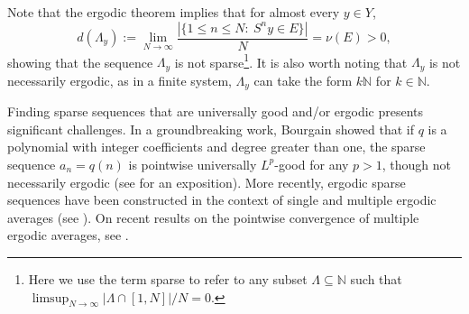 \documentclass[11pt]{amsart}
\numberwithin{equation}{section}
\theoremstyle{definition}
\theoremstyle{plain}
\newcommand{\N}{{\mathbb N}}
\begin{document}
Note that the ergodic theorem implies that for almost every $y\in Y$,
\[d(\Lambda_y):=\lim_{N\to \infty}\dfrac{|\{1\leq n\leq N:\ S^ny\in E\}|}{N}=\nu(E)>0,\]
showing that the sequence $\Lambda_y$ is not sparse\footnote{Here we use the term sparse to refer to any subset $\Lambda\subseteq \N$ such that $\limsup_{N\to \infty} |\Lambda \cap [1,N]|/N =0$.}. It is also worth noting that $\Lambda_y$ is not necessarily ergodic, as in a finite system, $\Lambda_y$ can take the form $k\N$ for $k\in \N$. 

Finding sparse sequences that are universally good and/or ergodic presents significant challenges. In a groundbreaking work, Bourgain \cite{Bourgain_Pointwise_89} showed that if $q$ is a polynomial with integer coefficients and degree greater than one, the sparse sequence $a_n=q(n)$ is pointwise universally $L^p$-good for any $p>1$, though not necessarily ergodic (see \cite{krause2023pointwiseergodictheoryexamples} for an exposition). More recently,  ergodic sparse sequences have been constructed in the context of single and multiple ergodic averages (see \cite{Boshernitzan_Kolesnik_Quas_Wierdl_erg_sequences:2005, Donoso_Ferre_Koutsogiannis_Sun_multicorr_joint_erg:2024,Donoso_Koutsogiannis_Kuca_Tsinas_Sun_multiple_Hardy,Donoso_Koutsogiannis_Sun_seminorms_polynomials_joint_ergodicity:2022,Donoso_Koutsogiannis_Sun_joint_erg_poly_growth:2023,Frantzikinakis_multidim_Szemeredi_Hardy:2015,Frantzikinakis_joint_ergodicity_sequences:2023,Frantzikinakis_Kuca_joint_erg_comm_poly:2025}). On recent results on the pointwise convergence of multiple ergodic averages, see \cite{Donoso_Sun_pointwise_convergence_multiple_averages:2018, Huang_Shao_Ye_pointwise_convergence_models:2019,KMPW,
krause2025unified,Krause_Tao_Mirek}.
\end{document}
